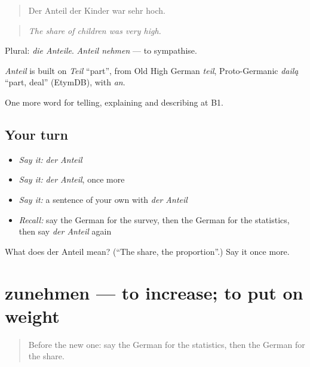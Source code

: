 \begin{quote}
Der Anteil der Kinder war sehr hoch.
\end{quote}

\begin{quote}
\emph{The share of children was very high.}
\end{quote}

Plural: \emph{die Anteile}. \emph{Anteil nehmen} — to sympathise.

\begin{cousinweb}
\emph{Anteil} is built on \emph{Teil} \textquotedblleft{}part\textquotedblright{}, from Old High German \emph{teil}, Proto-Germanic \emph{dailą} \textquotedblleft{}part, deal\textquotedblright{} (EtymDB), with \emph{an}.
\end{cousinweb}

\begin{grammarlens}[title={What you've built}]
One more word for telling, explaining and describing at B1.
\end{grammarlens}

\subsection*{Your turn}
\begin{itemize}
\raggedright
  \item \emph{Say it:} \emph{der Anteil}
  \item \emph{Say it:} \emph{der Anteil}, once more
  \item \emph{Say it:} a sentence of your own with \emph{der Anteil}
  \item \emph{Recall:} say the German for the survey, then the German for the statistics, then say \emph{der Anteil} again
\end{itemize}

\begin{tcolorbox}[breakable,colback=teal!4,colframe=teal!35!black,title={Before you move on}]
What does der Anteil mean? (\textquotedblleft{}The share, the proportion\textquotedblright{}.) Say it once more.
\end{tcolorbox}
\section[zunehmen]{zunehmen — to increase; to put on weight}

\label{lesson:GE-C276-zunehmen}



\begin{quote}
Before the new one: say the German for the statistics, then the German for the share.
\end{quote}

